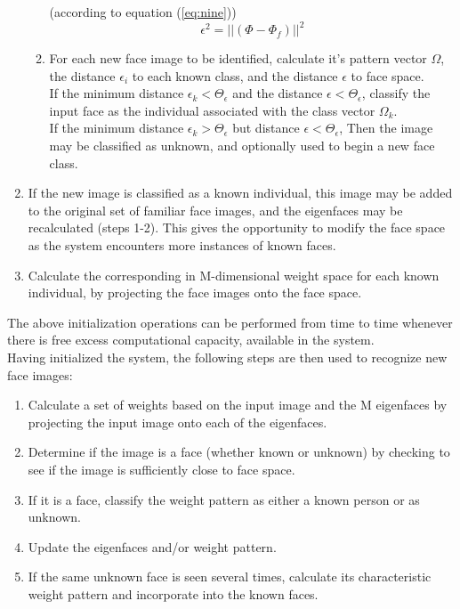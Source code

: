 \documentclass[conference]{IEEEtran}
\begin{document}
\begin{enumerate}
\begin{enumerate}
                (according to equation (\ref{eq:nine})) \\
                \begin{equation} \label{eq:nine}
                  \epsilon^{2} = || (\Phi - \Phi_{f}) ||^{2}
                \end{equation}
          \item For each new face image to be identified, calculate it's pattern
                vector $ \Omega $, the distance $ \epsilon_{i} $ to each known
                class, and the distance $ \epsilon $ to face space. \\
                If the minimum distance $ \epsilon_{k} < \Theta_{\epsilon} $
                and the distance $ \epsilon < \Theta_{\epsilon} $, classify the
                input face as the individual associated with the class vector
                $ \Omega_{k} $. \\
                If the minimum distance $ \epsilon_{k} > \Theta_{\epsilon} $ but
                distance $ \epsilon < \Theta_{\epsilon} $, Then the image may be
                classified as unknown, and optionally used to begin a new face class.
        \end{enumerate}
  \item If the new image is classified as a known individual, this image may be added
        to the original set of familiar face images, and the eigenfaces may be recalculated
        (steps 1-2). This gives the opportunity to modify the face space as the
        system encounters more instances of known faces.
  \item Calculate the corresponding in M-dimensional weight space for each known
        individual, by projecting the face images onto the face space.
\end{enumerate}
The above initialization operations can be performed from time to time whenever
there is free excess computational capacity, available in the system. \\
Having initialized the system, the following steps are then used to recognize
new face images: \\
\begin{enumerate}
  \item Calculate a set of weights based on the input image and the M eigenfaces
        by projecting the input image onto each of the eigenfaces.
  \item Determine if the image is a face (whether known or unknown) by checking
        to see if the image is sufficiently close to face space.
  \item If it is a face, classify the weight pattern as either a known person or
        as unknown.
  \item Update the eigenfaces and/or weight pattern.
  \item If the same unknown face is seen several times, calculate its characteristic
        weight pattern and incorporate into the known faces.
\end{enumerate}
\end{document}
